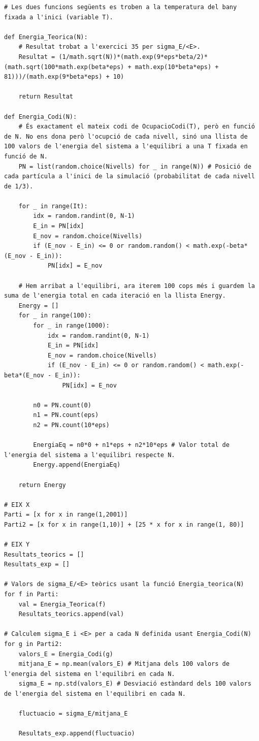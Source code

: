 \documentclass[a4paper,10.5pt]{report}
\begin{document}
\begin{lstlisting}[caption={Estudi de les fluctuacions en l'energia.}]
# Les dues funcions següents es troben a la temperatura del bany fixada a l'inici (variable T).

def Energia_Teorica(N): 
	# Resultat trobat a l'exercici 35 per sigma_E/<E>.
	Resultat = (1/math.sqrt(N))*(math.exp(9*eps*beta/2)*(math.sqrt(100*math.exp(beta*eps) + math.exp(10*beta*eps) + 81)))/(math.exp(9*beta*eps) + 10)
	
	return Resultat

def Energia_Codi(N): 
	# És exactament el mateix codi de OcupacioCodi(T), però en funció de N. No ens dona però l'ocupció de cada nivell, sinó una llista de 100 valors de l'energia del sistema a l'equilibri a una T fixada en funció de N. 
	PN = list(random.choice(Nivells) for _ in range(N)) # Posició de cada partícula a l'inici de la simulació (probabilitat de cada nivell de 1/3).
	
	for _ in range(It): 
		idx = random.randint(0, N-1)
		E_in = PN[idx]
		E_nov = random.choice(Nivells)
		if (E_nov - E_in) <= 0 or random.random() < math.exp(-beta*(E_nov - E_in)):
			PN[idx] = E_nov
	
	# Hem arribat a l'equilibri, ara iterem 100 cops més i guardem la suma de l'energia total en cada iteració en la llista Energy. 
	Energy = []
	for _ in range(100):
		for _ in range(1000):
			idx = random.randint(0, N-1)
			E_in = PN[idx]
			E_nov = random.choice(Nivells)
			if (E_nov - E_in) <= 0 or random.random() < math.exp(-beta*(E_nov - E_in)):
				PN[idx] = E_nov
	
		n0 = PN.count(0)
		n1 = PN.count(eps)
		n2 = PN.count(10*eps)
	
		EnergiaEq = n0*0 + n1*eps + n2*10*eps # Valor total de l'energia del sistema a l'equilibri respecte N.
		Energy.append(EnergiaEq)
	
	return Energy

# EIX X 
Parti = [x for x in range(1,2001)]
Parti2 = [x for x in range(1,10)] + [25 * x for x in range(1, 80)]

# EIX Y
Resultats_teorics = []
Resultats_exp = []

# Valors de sigma_E/<E> teòrics usant la funció Energia_teorica(N)
for f in Parti:
	val = Energia_Teorica(f)
	Resultats_teorics.append(val)

# Calculem sigma_E i <E> per a cada N definida usant Energia_Codi(N)
for g in Parti2:
	valors_E = Energia_Codi(g)
	mitjana_E = np.mean(valors_E) # Mitjana dels 100 valors de l'energia del sistema en l'equilibri en cada N.
	sigma_E = np.std(valors_E) # Desviació estàndard dels 100 valors de l'energia del sistema en l'equilibri en cada N.
	
	fluctuacio = sigma_E/mitjana_E
	
	Resultats_exp.append(fluctuacio)
	
\end{lstlisting}
\end{document}
